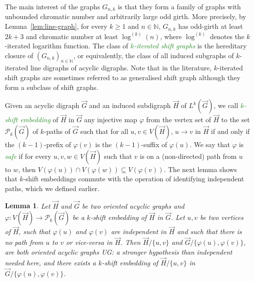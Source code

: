 \documentclass[11pt,a4aper]{article}
\newtheorem{lemma}[theorem]{Lemma}
\renewcommand{\geq}{\geqslant}
\DeclareRobustCommand*{\ora}{\overrightarrow}
\renewcommand{\phi}{\varphi}
\newcommand*{\orG}{\ora{G}}
\newcommand*{\orH}{\ora{H}}
\newcommand*{\Pc}{\mathcal{P}}
\newcommand{\defin}[1]{\emph{\textcolor{ForestGreen}{#1}}}
\newcommand{\ugo}[1]{{\color{red} UG: #1}}
\begin{document}
The main interest of the graphs $G_{n,k}$ is that they form a family
of graphs with unbounded chromatic number and arbitrarily large odd girth. More
precisely, by Lemma~\ref{lem:line-graph}, for every $k\geq 1$ and $n\in \mathbb N$,
$G_{n,k}$ has odd-girth at least $2k+3$ %
and chromatic number at least $\log^{(k)}(n)$, where $\log^{(k)}$ denotes the
$k$-iterated logarithm function. The class of \defin{$k$-iterated shift graphs}
is the hereditary closure of $(G_{n,k})_{n \in \mathbb{N}}$, or equivalently,
the class of all induced subgraphs of $k$-iterated line digraphs of acyclic
digraphs. Note that in the literature, $k$-iterated shift graphs are sometimes referred
to as generalised shift graph although they form a subclass of shift graphs.

Given an acyclic digraph $\orG$ and an induced subdigraph $\orH$ of $L^k(\orG)$,
we call \defin{$k$-shift embedding} of $\orH$ in $\orG$ any injective map $\phi$
from the vertex set of $\orH$ to the set $\Pc_k(\orG)$ of $k$-paths of $\orG$ such that for all
$u,v\in V(\orH)$, $u\to v$ in $\orH$ if and only if the $(k-1)$-prefix of
$\phi(v)$ is the $(k-1)$-suffix of $\phi(u)$. We say that $\phi$ is
\defin{safe} if for every $u,v,w \in V(\orH)$ such that $v$ is on a
(non-directed) path from $u$ to $w$, then
$V(\phi(u))\cap V(\phi(w)) \subseteq V(\phi(v))$. The next lemma shows that
$k$-shift embeddings commute with the operation of identifying independent paths, which we defined earlier.


\begin{lemma}\label{lem:gluing}
  Let $\orH$ and $\orG$ be two oriented acyclic graphs and $\phi: V(\orH)\to \Pc_k(\orG)$ be a $k$-shift
  embedding of $\orH$ in $\orG$. Let $u,v$ be two vertices of $\orH$, such that
  $\phi(u)$ and $\phi(v)$ are independent in $\orH$ and such that there is no path from $u$ to $v$ or vice-versa in $\orH$. Then $\orH / \{u,v\}$ and
  $\orG / \{\phi(u),\phi(v)\}$, are both oriented acyclic graphs \ugo{a stronger hypothesis than independent needed here}, and   
  there exists a $k$-shift embedding of $\orH / \{u,v\}$ in
  $\orG / \{\phi(u),\phi(v)\}$.
\end{lemma}
\end{document}
